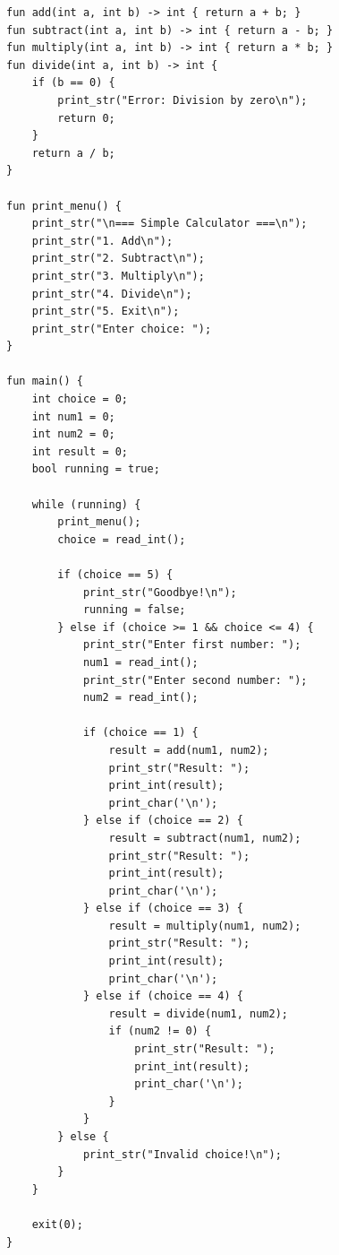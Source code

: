 \documentclass[12pt,a4paper,oneside]{book}
\begin{document}
\begin{lstlisting}[style=algo, caption={Simple Calculator Program}]
fun add(int a, int b) -> int { return a + b; }
fun subtract(int a, int b) -> int { return a - b; }
fun multiply(int a, int b) -> int { return a * b; }
fun divide(int a, int b) -> int {
    if (b == 0) {
        print_str("Error: Division by zero\n");
        return 0;
    }
    return a / b;
}

fun print_menu() {
    print_str("\n=== Simple Calculator ===\n");
    print_str("1. Add\n");
    print_str("2. Subtract\n");
    print_str("3. Multiply\n");
    print_str("4. Divide\n");
    print_str("5. Exit\n");
    print_str("Enter choice: ");
}

fun main() {
    int choice = 0;
    int num1 = 0;
    int num2 = 0;
    int result = 0;
    bool running = true;
    
    while (running) {
        print_menu();
        choice = read_int();
        
        if (choice == 5) {
            print_str("Goodbye!\n");
            running = false;
        } else if (choice >= 1 && choice <= 4) {
            print_str("Enter first number: ");
            num1 = read_int();
            print_str("Enter second number: ");
            num2 = read_int();
            
            if (choice == 1) {
                result = add(num1, num2);
                print_str("Result: ");
                print_int(result);
                print_char('\n');
            } else if (choice == 2) {
                result = subtract(num1, num2);
                print_str("Result: ");
                print_int(result);
                print_char('\n');
            } else if (choice == 3) {
                result = multiply(num1, num2);
                print_str("Result: ");
                print_int(result);
                print_char('\n');
            } else if (choice == 4) {
                result = divide(num1, num2);
                if (num2 != 0) {
                    print_str("Result: ");
                    print_int(result);
                    print_char('\n');
                }
            }
        } else {
            print_str("Invalid choice!\n");
        }
    }
    
    exit(0);
}
\end{lstlisting}

\end{document}
